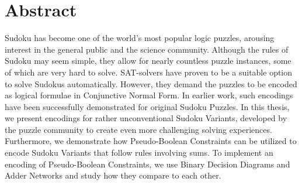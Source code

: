 \chapter{Abstract}
Sudoku has become one of the world's most popular logic puzzles, arousing interest in the general public and the science community. Although the rules of Sudoku may seem simple, they allow for nearly countless puzzle instances, some of which are very hard to solve. SAT-solvers have proven to be a suitable option to solve Sudokus automatically. However, they demand the puzzles to be encoded as logical formulae in Conjunctive Normal Form. In earlier work, such encodings have been successfully demonstrated for original Sudoku Puzzles. In this thesis, we present encodings for rather unconventional Sudoku Variants, developed by the puzzle community to create even more challenging solving experiences. Furthermore, we demonstrate how Pseudo-Boolean Constraints can be utilized to encode Sudoku Variants that follow rules involving sums. To implement an encoding of Pseudo-Boolean Constraints, we use Binary Decision Diagrams and Adder Networks and study how they compare to each other.
